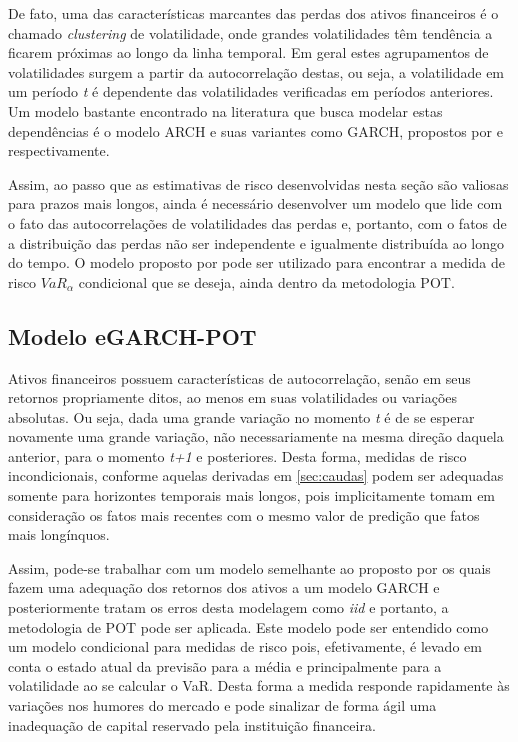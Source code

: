 \documentclass[review]{elsarticle}
\theoremstyle{definition}
\begin{document}
De fato, uma das características marcantes das perdas dos ativos financeiros é o chamado \emph{clustering} de volatilidade, onde grandes volatilidades têm tendência a ficarem próximas ao longo da linha temporal. Em geral estes agrupamentos de volatilidades surgem a partir da autocorrelação destas, ou seja, a volatilidade em um período \emph{t} é dependente das volatilidades verificadas em períodos anteriores. Um modelo bastante encontrado na literatura que busca modelar estas dependências é o modelo ARCH e suas variantes como GARCH, propostos por \cite{Engle1982} e \cite{Bollerslev1986} respectivamente.

Assim, ao passo que as estimativas de risco desenvolvidas nesta seção são valiosas para prazos mais longos, ainda é necessário desenvolver um modelo que lide com o fato das autocorrelações de volatilidades das perdas e, portanto, com o fatos de a distribuição das perdas não ser independente e igualmente distribuída ao longo do tempo. O modelo proposto por \cite{McNeil2000} pode ser utilizado para encontrar a medida de risco $VaR_\alpha$ condicional que se deseja, ainda dentro da metodologia POT.

\subsection{Modelo eGARCH-POT}
\label{sec:egarchpot}

Ativos financeiros possuem características de autocorrelação, senão em seus retornos propriamente ditos, ao menos em suas volatilidades ou variações absolutas. Ou seja, dada uma grande variação no momento \emph{t} é de se esperar novamente uma grande variação, não necessariamente na mesma direção daquela anterior, para o momento \emph{t+1} e posteriores. Desta forma, medidas de risco incondicionais, conforme aquelas derivadas em \ref{sec:caudas} podem ser adequadas somente para horizontes temporais mais longos, pois implicitamente tomam em consideração os fatos mais recentes com o mesmo valor de predição que fatos mais longínquos.

Assim, pode-se trabalhar com um modelo semelhante ao proposto por \cite{McNeil2000} os quais fazem uma adequação dos retornos dos ativos a um modelo GARCH e posteriormente tratam os erros desta modelagem como \emph{iid} e portanto, a metodologia de POT pode ser aplicada. Este modelo pode ser entendido como um modelo condicional para medidas de risco pois, efetivamente, é levado em conta o estado atual da previsão para a média e principalmente para a volatilidade ao se calcular o VaR. Desta forma a medida responde rapidamente às variações nos humores do mercado e pode sinalizar de forma ágil uma inadequação de capital reservado pela instituição financeira.
\end{document}
